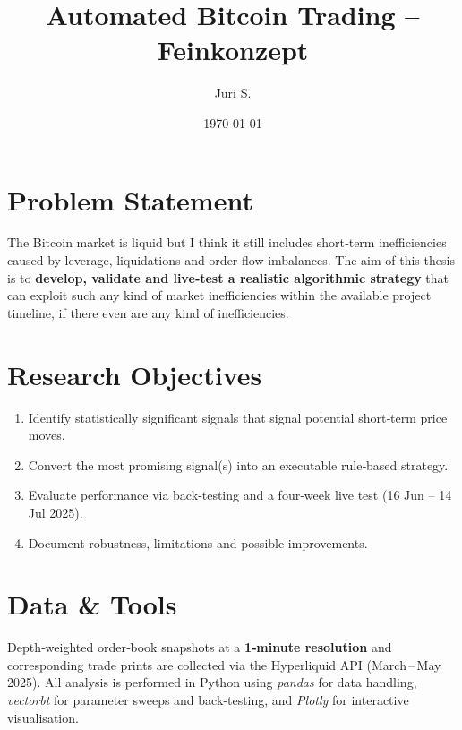 \documentclass[a4paper,12pt]{article}
\title{Automated Bitcoin Trading – Feinkonzept}
\author{Juri S.}
\date{\today}
\begin{document}
\maketitle
\tableofcontents
\newpage

\section{Problem Statement}

The Bitcoin market is liquid but I think it still includes short‑term inefficiencies
caused by leverage, liquidations and order‑flow imbalances.  
The aim of this thesis is to \textbf{develop, validate and live‑test a
realistic algorithmic strategy} that can exploit such any kind of market inefficiencies
 within the available project timeline, if there even are any kind of inefficiencies.

\section{Research Objectives}

\begin{enumerate}
  \item Identify statistically significant signals that
        signal potential short‑term price moves.
  \item Convert the most promising signal(s) into an executable
        rule‑based strategy.
  \item Evaluate performance via back‑testing and a four‑week live test
        (16 Jun – 14 Jul 2025).
  \item Document robustness, limitations and possible improvements.
\end{enumerate}

\section{Data \& Tools}

Depth‑weighted order‑book snapshots at a \textbf{1‑minute resolution}
and corresponding trade prints are collected via the Hyperliquid API
(March\,--\,May\,2025).  All analysis is performed in Python using
\emph{pandas} for data handling, \emph{vectorbt} for parameter sweeps
and back‑testing, and \emph{Plotly} for interactive visualisation.
\end{document}
